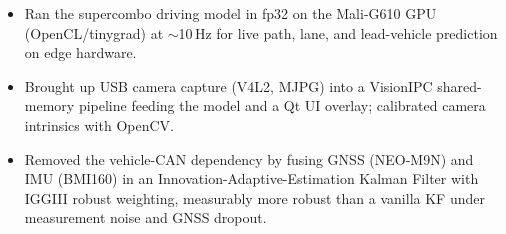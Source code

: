\documentclass[11pt,a4paper,sans]{moderncv}
\begin{document}
\begin{itemize}
{{\begin{itemize}
    \item Ran the supercombo driving model in fp32 on the Mali-G610 GPU (OpenCL/tinygrad) at ${\sim}$10\,Hz for live path, lane, and lead-vehicle prediction on edge hardware.
    \item Brought up USB camera capture (V4L2, MJPG) into a VisionIPC shared-memory pipeline feeding the model and a Qt UI overlay; calibrated camera intrinsics with OpenCV.
    \item Removed the vehicle-CAN dependency by fusing GNSS (NEO-M9N) and IMU (BMI160) in an Innovation-Adaptive-Estimation Kalman Filter with IGGIII robust weighting, measurably more robust than a vanilla KF under measurement noise and GNSS dropout.
\end{itemize}}}

\end{itemize}

\end{document}
